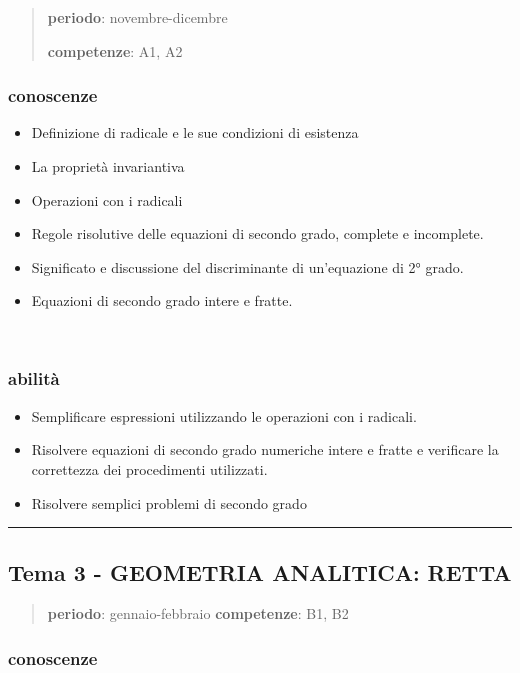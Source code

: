 \documentclass[12pt, a4paper]{exam}
\begin{document}
\begin{quote}
\textbf{periodo}: novembre-dicembre

\textbf{competenze}: A1, A2
\end{quote}


\subsubsection*{conoscenze}

\begin{itemize}
\item
  Definizione di radicale e le sue condizioni di esistenza
\item
  La proprietà invariantiva
\item
  Operazioni con i radicali
\item
  Regole risolutive delle equazioni di secondo grado, complete e
  incomplete.
\item
  Significato e discussione del discriminante di un'equazione di 2°
  grado.
\item
  Equazioni di secondo grado intere e fratte.
\end{itemize}

\
\subsubsection*{abilità}

\begin{itemize}
\item
  Semplificare espressioni utilizzando le operazioni con i radicali.
\item
  Risolvere equazioni di secondo grado numeriche intere e fratte e
  verificare la correttezza dei procedimenti utilizzati.
\item
  Risolvere semplici problemi di secondo grado
\end{itemize}

\bigskip
\hrule
\bigskip

\subsection*{Tema 3 - GEOMETRIA ANALITICA: RETTA}

\begin{quote}
\textbf{periodo}: gennaio-febbraio \textbf{competenze}: B1, B2
\end{quote}


\subsubsection*{conoscenze}
\end{document}
